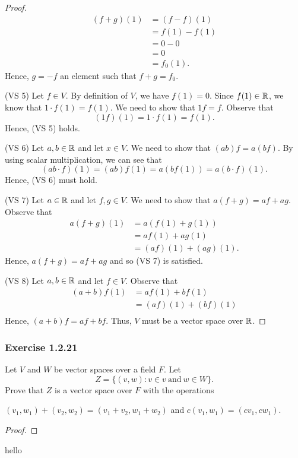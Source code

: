 \begin{proof}
    \begin{align*}
        (f+g)(1)  &= (f - f)(1)  \\
                  &= f(1) - f(1) \\
                  &= 0 - 0  \\
                  &= 0 \\
                  &= f_{0}(1).
    \end{align*}
    Hence, \( g = -f  \) an element such that \( f + g = f_{0} \).
\item[(VS 5)] Let \( f \in V  \). By definition of \( V  \), we have  \( f(1) = 0   \). Since \( f(1) \in \mathbb{R}  \), we know that \( 1 \cdot f(1) = f(1) \). We need to show that \( 1f = f  \). Observe that \[  (1f)(1) = 1 \cdot f(1) = f(1).  \]
    Hence, (VS 5) holds.
\item[(VS 6)] Let \( a,b \in \mathbb{R}  \) and let \( x \in V  \). We need to show that \( (ab)f = a(bf)  \). By using scalar multiplication, we can see that 
    \[  (ab \cdot f) (1) = (ab)f(1) = a (bf(1)) = a(b \cdot f)(1). \]
    Hence,  (VS 6) must hold.
\item[(VS 7)] Let \( a \in \mathbb{R}  \) and let \( f,g \in V  \). We need to show that \( a(f+g) = af + ag \). Observe that 
    \begin{align*}
        a(f+g)(1) &= a (f(1) + g(1))  \\
                  &= a f(1) + a g(1) \\
                  &=  (af)(1) + (ag)(1).
    \end{align*}
    Hence, \( a(f+g) = af + ag \) and so (VS 7) is satisfied.
\item[(VS 8)] Let \( a,b \in \mathbb{R}  \) and let \( f \in V  \). Observe that 
    \begin{align*}
        (a+b)f(1) &= a f(1) + b f(1)  \\
                  &=  (af)(1) + (bf)(1) \\
    \end{align*}
    Hence, \( (a+b)f =  af + bf  \). 
Thus, \( V  \) must be a vector space over \( \mathbb{R}  \).
\end{proof}

\subsubsection{Exercise 1.2.21} 
Let \( V  \) and \( W  \) be vector spaces over a field \( F  \). Let 
\[  Z = \{ (v,w): v \in v \ \text{and} \  w \in W  \}. \]
Prove that \( Z  \) is a vector space over \( F  \) with the operations   
\begin{center}
   \( (v_{1}, w_{1}) + (v_{2}, w_{2}) = (v_{1} + v_{2} , w_{1} + w_{2} ) \) and \( c(v_{1}, w_{1} ) = (cv_{1}, cw_{1} ) \). 
\end{center}
\begin{proof}

\end{proof}

hello



